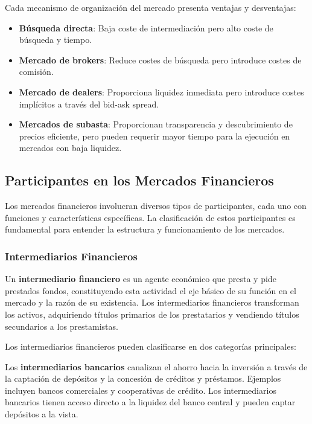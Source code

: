 \begin{proposicion}
Cada mecanismo de organización del mercado presenta ventajas y desventajas:
\begin{itemize}
\item \textbf{Búsqueda directa}: Baja coste de intermediación pero alto coste de búsqueda y tiempo.
\item \textbf{Mercado de brokers}: Reduce costes de búsqueda pero introduce costes de comisión.
\item \textbf{Mercado de dealers}: Proporciona liquidez inmediata pero introduce costes implícitos a través del bid-ask spread.
\item \textbf{Mercados de subasta}: Proporcionan transparencia y descubrimiento de precios eficiente, pero pueden requerir mayor tiempo para la ejecución en mercados con baja liquidez.
\end{itemize}
\end{proposicion}

\subsection{Participantes en los Mercados Financieros}

Los mercados financieros involucran diversos tipos de participantes, cada uno con funciones y características específicas. La clasificación de estos participantes es fundamental para entender la estructura y funcionamiento de los mercados.

\subsubsection{Intermediarios Financieros}

\begin{definicion}
Un \textbf{intermediario financiero} es un agente económico que presta y pide prestados fondos, constituyendo esta actividad el eje básico de su función en el mercado y la razón de su existencia. Los intermediarios financieros transforman los activos, adquiriendo títulos primarios de los prestatarios y vendiendo títulos secundarios a los prestamistas.
\end{definicion}

Los intermediarios financieros pueden clasificarse en dos categorías principales:

\begin{definicion}
Los \textbf{intermediarios bancarios} canalizan el ahorro hacia la inversión a través de la captación de depósitos y la concesión de créditos y préstamos. Ejemplos incluyen bancos comerciales y cooperativas de crédito. Los intermediarios bancarios tienen acceso directo a la liquidez del banco central y pueden captar depósitos a la vista.
\end{definicion}

